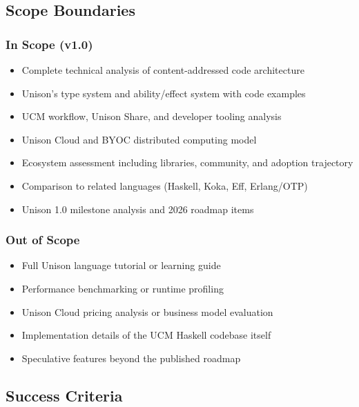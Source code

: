 \documentclass[11pt,letterpaper]{article}
\begin{document}
\subsection{Scope Boundaries}

\subsubsection*{In Scope (v1.0)}
\begin{itemize}[leftmargin=2em]
  \item Complete technical analysis of content-addressed code architecture
  \item Unison's type system and ability/effect system with code examples
  \item UCM workflow, Unison Share, and developer tooling analysis
  \item Unison Cloud and BYOC distributed computing model
  \item Ecosystem assessment including libraries, community, and adoption trajectory
  \item Comparison to related languages (Haskell, Koka, Eff, Erlang/OTP)
  \item Unison 1.0 milestone analysis and 2026 roadmap items
\end{itemize}

\subsubsection*{Out of Scope}
\begin{itemize}[leftmargin=2em]
  \item Full Unison language tutorial or learning guide
  \item Performance benchmarking or runtime profiling
  \item Unison Cloud pricing analysis or business model evaluation
  \item Implementation details of the UCM Haskell codebase itself
  \item Speculative features beyond the published roadmap
\end{itemize}

\subsection{Success Criteria}
\end{document}
